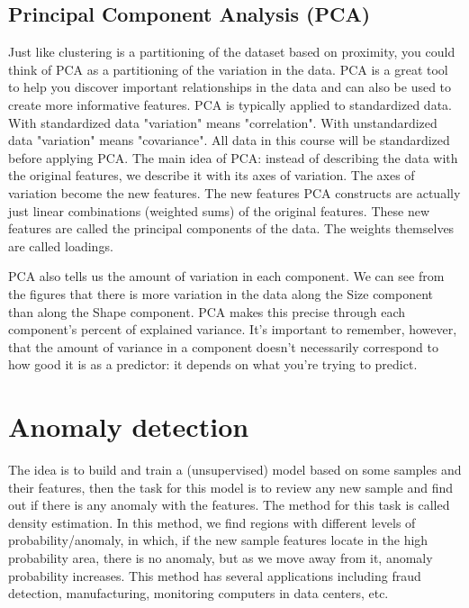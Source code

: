 \documentclass[12pt]{report}
\begin{document}
\subsection{Principal Component Analysis (PCA)}
Just like clustering is a partitioning of the dataset based on proximity, you could think of PCA as a partitioning of the variation in the data. PCA is a great tool to help you discover important relationships in the data and can also be used to create more informative features. PCA is typically applied to standardized data. With standardized data "variation" means "correlation". With unstandardized data "variation" means "covariance". All data in this course will be standardized before applying PCA. The main idea of PCA: instead of describing the data with the original features, we describe it with its axes of variation. The axes of variation become the new features. The new features PCA constructs are actually just linear combinations (weighted sums) of the original features. These new features are called the principal components of the data. The weights themselves are called loadings.

PCA also tells us the amount of variation in each component. We can see from the figures that there is more variation in the data along the Size component than along the Shape component. PCA makes this precise through each component's percent of explained variance. It's important to remember, however, that the amount of variance in a component doesn't necessarily correspond to how good it is as a predictor: it depends on what you're trying to predict.


\section{Anomaly detection}
The idea is to build and train a (unsupervised) model based on some samples and their features, then the task for this model is to review any new sample and find out if there is any anomaly with the features. The method for this task is called density estimation. In this method, we find regions with different levels of probability/anomaly, in which, if the new sample features locate in the high probability area, there is no anomaly, but as we move away from it, anomaly probability increases. This method has several applications including fraud detection, manufacturing, monitoring computers in data centers, etc.
\end{document}
